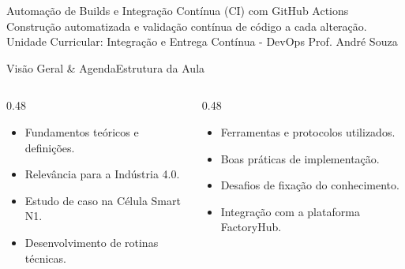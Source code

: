 
\senaicover
  {Automação de Builds e Integração Contínua (CI) com GitHub Actions}
  {Construção automatizada e validação contínua de código a cada alteração.}
  {Unidade Curricular: Integração e Entrega Contínua - DevOps}
  {Prof. André Souza}

\begin{senaiframe}{Visão Geral \& Agenda}{Estrutura da Aula}
  \begin{columns}[t]
    \begin{column}{0.48\textwidth}
      \begin{tcolorbox}[senaibluecard, title={1. Conceitos Chave}]
        \begin{itemize}
          \item Fundamentos teóricos e definições.
          \item Relevância para a Indústria 4.0.
        \end{itemize}
      \end{tcolorbox}
      \vspace{4pt}
      \begin{tcolorbox}[senaiambercard, title={3. Aplicação Prática}]
        \begin{itemize}
          \item Estudo de caso na Célula Smart N1.
          \item Desenvolvimento de rotinas técnicas.
        \end{itemize}
      \end{tcolorbox}
    \end{column}
    \begin{column}{0.48\textwidth}
      \begin{tcolorbox}[senairedcard, title={2. Detalhamento Técnico}]
        \begin{itemize}
          \item Ferramentas e protocolos utilizados.
          \item Boas práticas de implementação.
        \end{itemize}
      \end{tcolorbox}
      \vspace{4pt}
      \begin{tcolorbox}[senaigreencard, title={4. Exercícios \& Avaliação}]
        \begin{itemize}
          \item Desafios de fixação do conhecimento.
          \item Integração com a plataforma FactoryHub.
        \end{itemize}
      \end{tcolorbox}
    \end{column}
  \end{columns}
\end{senaiframe}

